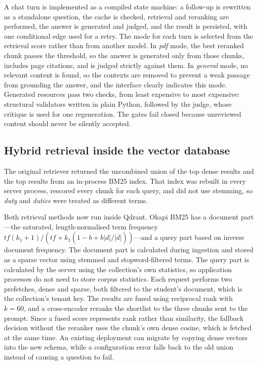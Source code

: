 \documentclass[conference]{IEEEtran}
\begin{document}
A chat turn is implemented as a compiled state machine: a follow-up is rewritten as a standalone
question, the cache is checked, retrieval and reranking are performed, the answer is generated and
judged, and the result is persisted, with one conditional edge used for a retry. The mode for each
turn is selected from the retrieval score rather than from another model. In \emph{pdf} mode, the
best reranked chunk passes the threshold, so the answer is generated only from those chunks, includes
page citations, and is judged strictly against them. In \emph{general} mode, no relevant content is
found, so the contexts are removed to prevent a weak passage from grounding the answer, and the
interface clearly indicates this mode. Generated resources pass two checks, from least expensive to
most expensive: structural validators written in plain Python, followed by the judge, whose critique
is used for one regeneration. The gates fail closed because unreviewed content should never be
silently accepted.

\subsection{Hybrid retrieval inside the vector database}
\label{sec:retrieval}

The original retriever returned the uncombined union of the top dense results and the top results from
an in-process BM25 index. That index was rebuilt in every server process, rescored every chunk for
each query, and did not use stemming, so \emph{duty} and \emph{duties} were treated as different terms.

Both retrieval methods now run inside Qdrant. Okapi BM25 \cite{robertson2009bm25} has a document
part---the saturated, length-normalised term frequency
$tf(k_1{+}1)/(tf+k_1(1-b+b|d|/\overline{|d|}))$---and a query part based on inverse document
frequency. The document part is calculated during ingestion and stored as a sparse vector using
stemmed and stopword-filtered terms. The query part is calculated by the server using the
collection's own statistics, so application processes do not need to store corpus statistics. Each
request performs two prefetches, dense and sparse, both filtered to the student's document, which is
the collection's tenant key. The results are fused using reciprocal rank \cite{cormack2009rrf} with
$k{=}60$, and a cross-encoder reranks the shortlist to the three chunks sent to the prompt. Since a
fused score represents rank rather than similarity, the fallback decision without the reranker uses
the chunk's own dense cosine, which is fetched at the same time. An existing deployment can migrate
by copying dense vectors into the new schema, while a configuration error falls back to the old
union instead of causing a question to fail.
\end{document}
